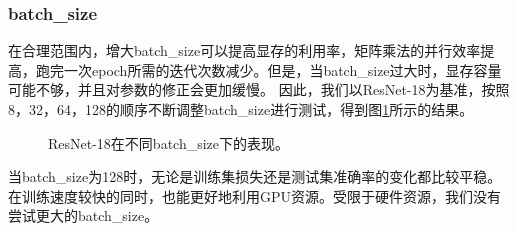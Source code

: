 \documentclass[hyperref, UTF8, 12pt]{article}
\theoremstyle{definition}
\begin{document}
\subsubsection{batch\_size}
在合理范围内，增大batch\_size可以提高显存的利用率，矩阵乘法的并行效率提高，跑完一次epoch所需的迭代次数减少。但是，当batch\_size过大时，显存容量可能不够，并且对参数的修正会更加缓慢。
因此，我们以ResNet-18为基准，按照8，32，64，128的顺序不断调整batch\_size进行测试，得到图\ref{fig:resnet18_batchsize}所示的结果。
\begin{figure}[H]
	\centering
	\caption{ResNet-18在不同batch\_size下的表现。}
	\label{fig:resnet18_batchsize}
\end{figure}
当batch\_size为128时，无论是训练集损失还是测试集准确率的变化都比较平稳。在训练速度较快的同时，也能更好地利用GPU资源。受限于硬件资源，我们没有尝试更大的batch\_size。
\end{document}

